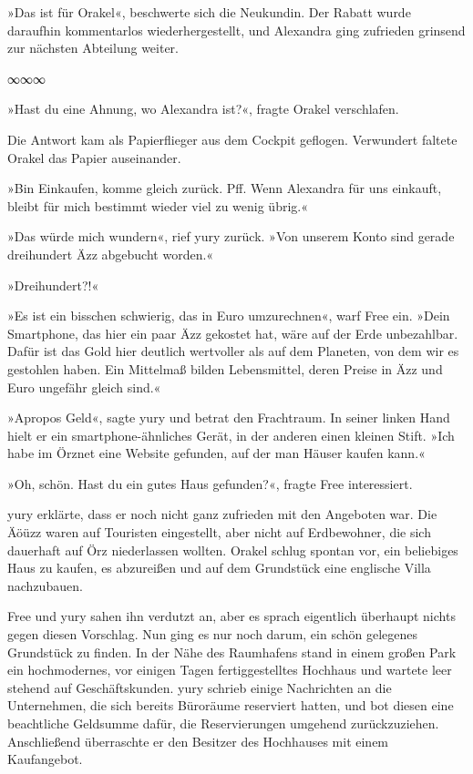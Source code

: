 »Das ist für Orakel«, beschwerte sich die Neukundin. Der Rabatt wurde daraufhin kommentarlos wiederhergestellt, und Alexandra ging zufrieden grinsend zur nächsten Abteilung weiter.

\begin{center}
    ∞∞∞
\end{center}

»Hast du eine Ahnung, wo Alexandra ist?«, fragte Orakel verschlafen.

Die Antwort kam als Papierflieger aus dem Cockpit geflogen. Verwundert faltete Orakel das Papier auseinander.

»Bin Einkaufen, komme gleich zurück. Pff. Wenn Alexandra für uns einkauft, bleibt für mich bestimmt wieder viel zu wenig übrig.«

»Das würde mich wundern«, rief yury zurück. »Von unserem Konto sind gerade dreihundert Äzz abgebucht worden.«

»Dreihundert?!«

»Es ist ein bisschen schwierig, das in Euro umzurechnen«, warf Free ein. »Dein Smartphone, das hier ein paar Äzz gekostet hat, wäre auf der Erde unbezahlbar. Dafür ist das Gold hier deutlich wertvoller als auf dem Planeten, von dem wir es gestohlen haben. Ein Mittelmaß bilden Lebensmittel, deren Preise in Äzz und Euro ungefähr gleich sind.«

»Apropos Geld«, sagte yury und betrat den Frachtraum. In seiner linken Hand hielt er ein smartphone-ähnliches Gerät, in der anderen einen kleinen Stift. »Ich habe im Örznet eine Website gefunden, auf der man Häuser kaufen kann.«

»Oh, schön. Hast du ein gutes Haus gefunden?«, fragte Free interessiert.

yury erklärte, dass er noch nicht ganz zufrieden mit den Angeboten war. Die Äöüzz waren auf Touristen eingestellt, aber nicht auf Erdbewohner, die sich dauerhaft auf Örz niederlassen wollten. Orakel schlug spontan vor, ein beliebiges Haus zu kaufen, es abzureißen und auf dem Grundstück eine englische Villa nachzubauen.

Free und yury sahen ihn verdutzt an, aber es sprach eigentlich überhaupt nichts gegen diesen Vorschlag. Nun ging es nur noch darum, ein schön gelegenes Grundstück zu finden. In der Nähe des Raumhafens stand in einem großen Park ein hochmodernes, vor einigen Tagen fertiggestelltes Hochhaus und wartete leer stehend auf Geschäftskunden. yury schrieb einige Nachrichten an die Unternehmen, die sich bereits Büroräume reserviert hatten, und bot diesen eine beachtliche Geldsumme dafür, die Reservierungen umgehend zurückzuziehen. Anschließend überraschte er den Besitzer des Hochhauses mit einem Kaufangebot.


